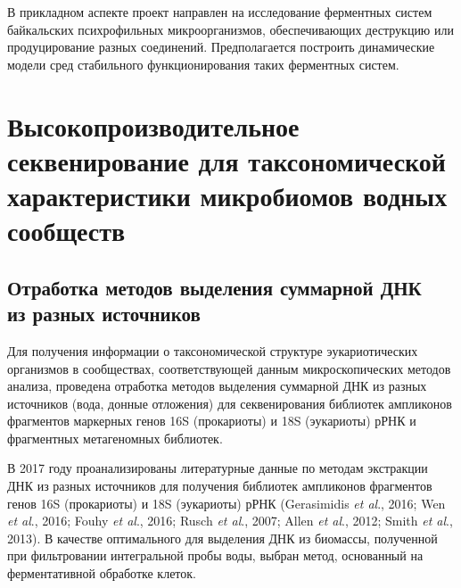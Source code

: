 \documentclass[a4paper,12pt,openany,final]{extreport}
\newcommand\theyear{2017}
\newcommand\MA[2]{{\sffamily\color{red}\hsmash{$\uparrow$}%
  \smash{\toplap{#1}{\scriptsize\bfseries #2}}}}
\begin{document}
В прикладном аспекте проект направлен на исследование ферментных систем байкальских психрофильных микроорганизмов, обеспечивающих деструкцию или продуцирование разных соединений. Предполагается построить динамические модели сред стабильного функционирования таких ферментных систем.

\chapter{Высокопроизводительное секвенирование для таксономической характеристики микробиомов водных сообществ}
\label{chap:1}

\section[Отработка методов выделения суммарной ДНК из разных источников]{Отработка методов выделения суммарной ДНК\\ из разных источников}

Для получения информации о таксономической структуре эукариотических организмов в сообществах, соответствующей данным микроскопических методов анализа, проведена отработка методов выделения суммарной ДНК из разных источников (вода, донные отложения) для секвенирования библиотек ампликонов фрагментов маркерных генов 16S (прокариоты) и 18S (эукариоты) рРНК и фрагментных метагеномных библиотек.

В \theyear{} году проанализированы литературные данные по методам экстракции ДНК из разных источников для получения библиотек ампликонов фрагментов генов 16S (прокариоты) и 18S (эукариоты) рРНК (Gerasimidis \textit{et al}., 2016; Wen \textit{et al}., 2016; Fouhy \textit{et al}., 2016; Rusch \textit{et al}., 2007; Allen \textit{et al}., 2012; Smith \textit{et al}., 2013). В качестве оптимального\MA{l}{Каков критерий оптимальности?} для выделения ДНК из биомассы, полученной при фильтровании интегральной пробы воды, выбран метод, основанный на ферментативной обработке клеток.
\end{document}
